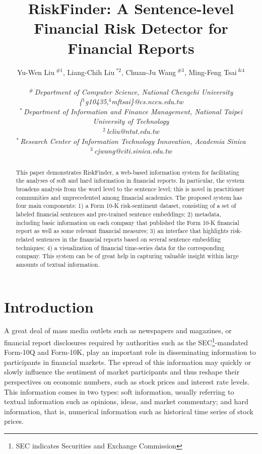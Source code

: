 \documentclass[10pt,conference,letterpaper]{IEEEtran}
\title{RiskFinder: A Sentence-level Financial Risk Detector for Financial Reports}
\author{
{Yu-Wen Liu{\small $~^{\#1}$}, Liang-Chih Liu{\small $~^{*2}$}, Chuan-Ju Wang{\small $~^{\#3}$}, Ming-Feng Tsai{\small $~^{\&4}$} }

\vspace{1.6mm}\\
\fontsize{10}{10}\selectfont\itshape
$^{\#}$\,Department of Computer Science, National Chengchi University\\
\fontsize{9}{9}\selectfont\ttfamily\upshape
\{{$^{1}$g10435,$^{4}$mftsai\}}@cs.nccu.edu.tw\\

\fontsize{10}{10}\selectfont\rmfamily\itshape
$^{*}$\,Department of Information and Finance Management, National Taipei University of Technology\\
\fontsize{9}{9}\selectfont\ttfamily\upshape
$^{2}$\,lcliu@ntut.edu.tw\\

\fontsize{10}{10}\selectfont\rmfamily\itshape
$^{*}$\,Research Center of Information Technology Innovation, Academia Sinica\\
\fontsize{9}{9}\selectfont\ttfamily\upshape
$^{3}$\,cjwang@citi.sinica.edu.tw\\
}
\begin{document}
\maketitle
\begin{abstract}
    This paper demonstrates RiskFinder, a web-based information system for facilitating the analyses of soft and hard information in financial reports. In particular, the system broadens analysis from the word level to the sentence level; this is novel in practitioner communities and unprecedented among financial academics. The proposed system has four main components: 1) a Form 10-K risk-sentiment dataset, consisting of a set of labeled financial sentences and pre-trained sentence embeddings; 2) metadata, including basic information on each company that published the Form 10-K financial report as well as some relevant financial measures; 3) an interface that highlights risk-related sentences in the financial reports based on several sentence embedding techniques; 4) a visualization of financial time-series data for the corresponding company.
    This system can be of great help in capturing valuable insight within large amounts of textual information.

\end{abstract}

\section{Introduction}
    A great deal of mass media outlets such as newspapers and magazines, or financial report disclosures required by authorities such as the SEC\footnote{SEC indicates Securities and Exchange Commission}-mandated Form-10Q and Form-10K, play an important role in disseminating information to participants in financial markets. The spread of this information may quickly or slowly influence the sentiment of market participants and thus reshape their perspectives on economic numbers, such as stock prices and interest rate levels. This information comes in two types: soft information, usually referring to textual information such as opinions, ideas, and market commentary; and hard information, that is, numerical information such as historical time series of stock prices.
\end{document}
